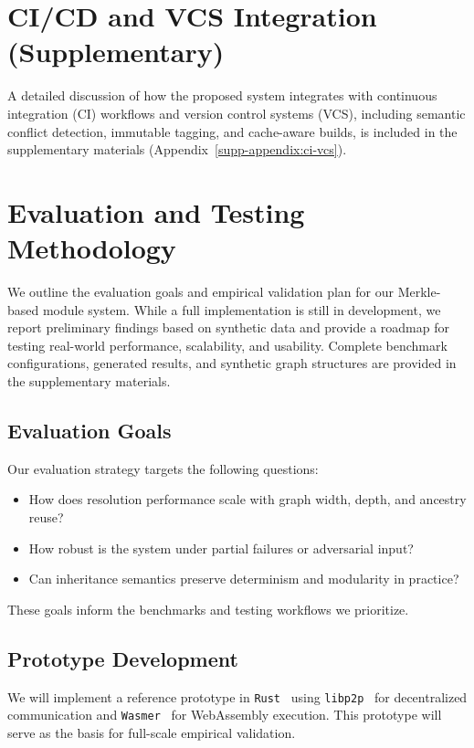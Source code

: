 \documentclass[sigplan,screen]{acmart}
\begin{document}
\section{CI/CD and VCS Integration (Supplementary)}
\label{sec:ci-vcs-integration}

A detailed discussion of how the proposed system integrates with continuous integration (CI) workflows and version control systems (VCS), including semantic conflict detection, immutable tagging, and cache-aware builds, is included in the supplementary materials (Appendix~\ref{supp-appendix:ci-vcs}).

\section{Evaluation and Testing Methodology}
\label{sec:evaluation}

We outline the evaluation goals and empirical validation plan for our Merkle-based module system. While a full implementation is still in development, we report preliminary findings based on synthetic data and provide a roadmap for testing real-world performance, scalability, and usability. Complete benchmark configurations, generated results, and synthetic graph structures are provided in the supplementary materials.

\subsection{Evaluation Goals}

Our evaluation strategy targets the following questions:

\begin{itemize}
  \item How does resolution performance scale with graph width, depth, and ancestry reuse?
  \item How robust is the system under partial failures or adversarial input?
  \item Can inheritance semantics preserve determinism and modularity in practice?
\end{itemize}

These goals inform the benchmarks and testing workflows we prioritize.

\subsection{Prototype Development}

We will implement a reference prototype in \texttt{Rust}~\cite{rust} using \texttt{libp2p}~\cite{libp2p} for decentralized communication and \texttt{Wasmer}~\cite{wasmer} for WebAssembly execution. This prototype will serve as the basis for full-scale empirical validation.
\end{document}
